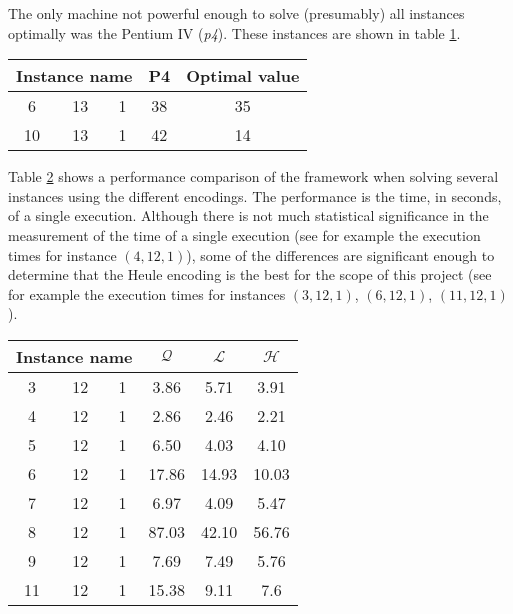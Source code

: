 The only machine not powerful enough to solve (presumably) all instances optimally
was the Pentium IV (\textit{p4}). These instances are shown in table
\ref{table:benchmark:SAT-results:suboptimalinstances}.

\begin{table}[H]
\centering
	\begin{tabular}{ccccc}
		\multicolumn{3}{c}{Instance name}
					& P4	& Optimal value \\
		\midrule
		 6 & 13 & 1	& 38	& 35 \\
		10 & 13 & 1	& 42	& 14 \\
	\end{tabular}
	\label{table:benchmark:SAT-results:suboptimalinstances}
\end{table}

Table \ref{table:benchmark:encoding-comparison} shows a performance comparison of the
framework when solving several instances using the different encodings. The performance
is the time, in seconds, of a single execution. Although there is not much statistical
significance in the measurement of the time of a single execution (see for example the
execution times for instance $(4,12,1)$), some of the differences
are significant enough to determine that the Heule encoding is the best for the scope
of this project (see for example the execution times for instances $(3,12,1)$, $(6,12,1)$,
$(11,12,1)$).

\begin{table}[H]
\centering
	\begin{tabular}{cccccc}
		\multicolumn{3}{c}{Instance name}
					& $\mathcal{Q}$	& $\mathcal{L}$ & $\mathcal{H}$ \\
		\midrule
		 3 & 12 & 1	&  3.86			&  5.71			&  3.91 \\
		 4 & 12 & 1	&  2.86			&  2.46			&  2.21 \\
		 5 & 12 & 1	&  6.50			&  4.03			&  4.10 \\
		 6 & 12 & 1	& 17.86			& 14.93			& 10.03 \\
		 7 & 12 & 1	&  6.97			&  4.09			&  5.47 \\
		 8 & 12 & 1	& 87.03			& 42.10			& 56.76 \\
		 9 & 12 & 1	&  7.69			&  7.49			&  5.76 \\
		11 & 12 & 1	& 15.38			&  9.11			&  7.6 \\
	\end{tabular}
	\label{table:benchmark:encoding-comparison}
\end{table}

